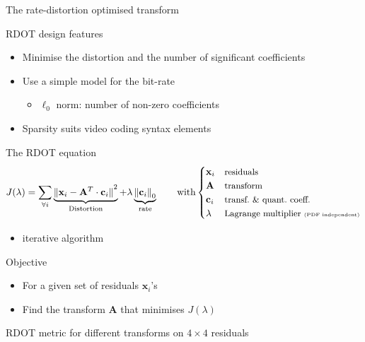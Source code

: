 \documentclass[10pt]{beamer} %
\def\x{\mathbf{x}}
\def\c{\mathbf{c}}
\def\A{\mathbf{A}}
\begin{document}
\begin{frame}{The rate-distortion optimised transform}
	\begin{block}{RDOT design features}
		\begin{itemize}
			\item Minimise the distortion and the number of significant coefficients
			\item Use a simple model for the bit-rate
				\begin{itemize}
					\item $\ell_0$ norm: number of non-zero coefficients
				\end{itemize}
			\item Sparsity suits video coding syntax elements
		\end{itemize}
	\end{block}
	\begin{block}{The RDOT equation}
		\vspace{-4em}
		$$J(\lambda)=\sum_{\forall i}
		\underbrace{{\Vert\x_i-\A^T\cdot
		\c_i\Vert}^2}_{\text{Distortion}}
		+\lambda
		\underbrace{{\Vert\c_i\Vert}_0}_{\text{rate}}
		\qquad\text{with}
		\begin{cases}
			\x_i & \text{\small residuals}\\
			\A   & \text{\small transform}\\
			\c_i & \text{\small transf.\ \& quant.\ coeff.}\\
			\lambda & \text{\small Lagrange multiplier \tiny (PDF independent)}
		\end{cases}$$
	\end{block}
	\vspace{-2em}
	\begin{itemize}
		\item iterative algorithm
	\end{itemize}
	\begin{block}{Objective}
		\vspace{-0.5em}
		\begin{itemize}
			\item For a given set of residuals $\x_i$'s
			\item Find the transform $\A$ that minimises $J(\lambda)$
		\end{itemize}
	\end{block}
\end{frame}

\begin{frame}{RDOT metric for different transforms on $4\times4$ residuals}
	\vfill
	\only<1>{}
	\only<2>{}
	\only<3>{}
	\only<4>{}
	\only<5>{}
	\only<6>{}
\end{frame}
\end{document}
